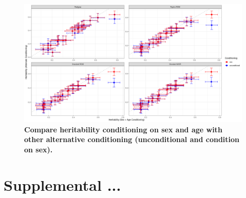 \documentclass[11pt]{article}
\begin{document}


\begin{figure}[bp!]
  \centering
  \includegraphics[width=\textwidth]{data/SFig_T2D_condition_compare.png}
  \caption{
    {\bf Compare heritability conditioning on sex and age with other alternative conditioning (unconditional and condition on sex).}
    }
  \label{fig:condition_compare}
\end{figure}



\section{Supplemental ...}
\end{document}
